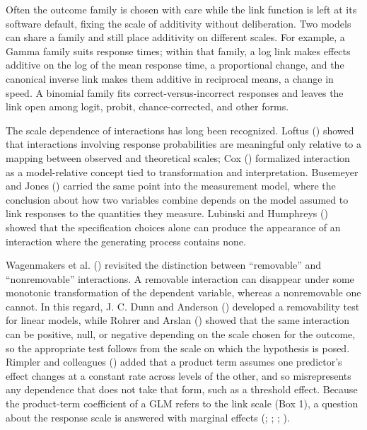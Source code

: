\documentclass[
  man,
  floatsintext,
  longtable,
  nolmodern,
  notxfonts,
  notimes,
  colorlinks=true,linkcolor=blue,citecolor=blue,urlcolor=blue]{apa7}
\newcounter{none} %
\begin{document}
Often the outcome family is chosen with care while the link function is
left at its software default, fixing the scale of additivity without
deliberation. Two models can share a family and still place additivity
on different scales. For example, a Gamma family suits response times;
within that family, a log link makes effects additive on the log of the
mean response time, a proportional change, and the canonical inverse
link makes them additive in reciprocal means, a change in speed. A
binomial family fits correct-versus-incorrect responses and leaves the
link open among logit, probit, chance-corrected, and other forms.

The scale dependence of interactions has long been recognized. Loftus
() showed that interactions involving
response probabilities are meaningful only relative to a mapping between
observed and theoretical scales; Cox ()
formalized interaction as a model-relative concept tied to
transformation and interpretation. Busemeyer and Jones
() carried the same point into the
measurement model, where the conclusion about how two variables combine
depends on the model assumed to link responses to the quantities they
measure. Lubinski and Humphreys ()
showed that the specification choices alone can produce the appearance
of an interaction where the generating process contains none.

Wagenmakers et al. () revisited the
distinction between ``removable'' and ``nonremovable'' interactions. A
removable interaction can disappear under some monotonic transformation
of the dependent variable, whereas a nonremovable one cannot. In this
regard, J. C. Dunn and Anderson ()
developed a removability test for linear models, while Rohrer and Arslan
() showed that the same interaction can
be positive, null, or negative depending on the scale chosen for the
outcome, so the appropriate test follows from the scale on which the
hypothesis is posed. Rimpler and colleagues
() added that a product term assumes one
predictor's effect changes at a constant rate across levels of the
other, and so misrepresents any dependence that does not take that form,
such as a threshold effect. Because the product-term coefficient of a
GLM refers to the link scale (Box 1), a question about the response
scale is answered with marginal effects (; ;
; ).
\end{document}
